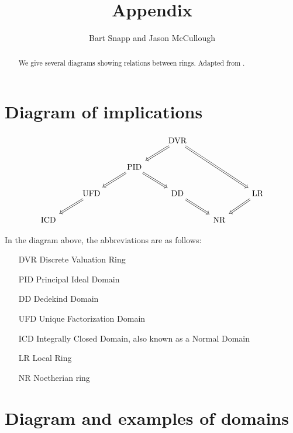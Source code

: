 \documentclass{ximera}
\author{Bart Snapp and Jason McCullough}
\title{Appendix}
\begin{document}
\begin{abstract}
We give several diagrams showing relations between rings.  Adapted
from \cite{sD2008}.
\end{abstract}
\maketitle

\section{Diagram of implications}

\[
\begin{tikzcd}          
              & &         & \text{DVR} \ar[Rightarrow,rrdd]\ar[Rightarrow,ld] &    &                 \\   
& & \text{PID} \ar[Rightarrow,rd]\ar[Rightarrow,ld] &  &                                   & \\
& \text{UFD} \ar[Rightarrow,ld] &   & \text{DD} \ar[Rightarrow,rd] &   & \text{LR} \ar[Rightarrow,ld] \\
\text{ICD} & & & & \text{NR} &                            
\end{tikzcd}                 
\]

\noindent In the diagram above, the abbreviations are as follows:

\begin{itemize}
\item[DVR] Discrete Valuation Ring
\item[PID] Principal Ideal Domain
\item[DD] Dedekind Domain
\item[UFD] Unique Factorization Domain
\item[ICD] Integrally Closed Domain, also known as a Normal Domain
\item[LR] Local Ring
\item[NR] Noetherian ring
\end{itemize}


\newpage

\section{Diagram and examples of domains}
\end{document}
